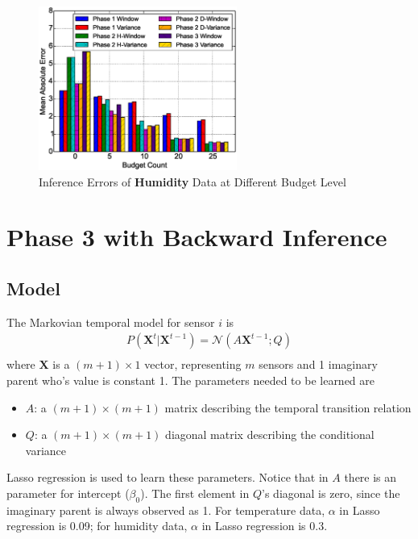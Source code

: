 \documentclass[12pt]{article}  %
\theoremstyle{definition}
\theoremstyle{remark}
\begin{document}
\begin{figure}[H]
\centering
        \includegraphics[width=0.58\textwidth]{../phase3/humidity_err}
        \caption{Inference Errors of \textbf{Humidity} Data at Different Budget Level}
\label{fig:phase3:humidity}
\end{figure}



\section{Phase 3 with Backward Inference}

\subsection{Model}
The Markovian temporal model for sensor $i$ is
\begin{align}
        P(\mathbf{X}^t | \mathbf{X}^{t-1}) = \mathcal{N}(A \mathbf{X}^{t-1}; Q) \\
\end{align}
where $\mathbf{X}$ is a $(m+1) \times 1$ vector, representing $m$ sensors and 1 imaginary parent
who's value is constant 1.
The parameters needed to be learned are
\begin{itemize}
        \item $A$: a $(m+1)\times (m+1)$ matrix describing the temporal transition relation
        \item $Q$: a $(m+1)\times (m+1)$ diagonal matrix describing the conditional variance
\end{itemize}
Lasso regression is used to learn these parameters.
Notice that in $A$ there is an parameter for intercept ($\beta_0$).
The first element in $Q$'s diagonal is zero, since the imaginary parent is always observed as 1.
For temperature data, $\alpha$ in Lasso regression is 0.09;
for humidity data, $\alpha$ in Lasso regression is 0.3.
\end{document}
